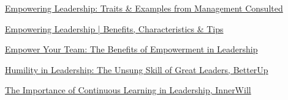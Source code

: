\documentclass[runningheads]{llncs}
\begin{document}
\begin{thebibliography}{10}
\href{https://managementconsulted.com/empowering-leadership/#:~:text=Here%20are%20some%20empowering%20leadership,They%20are%20effective%20communicators}{Empowering Leadership: Traits \& Examples from Management Consulted}

\href{https://www.leapsome.com/blog/empowering-leadership#:~:text=Empowering%20leadership%20is%20the%20practice,fits%20into%20the%20big%20picture}{Empowering Leadership | Benefits, Characteristics \& Tips}

\href{https://maven.com/articles/empowerment-in-leadership#:~:text=1,2}{Empower Your Team: The Benefits of Empowerment in Leadership}

\href{https://www.betterup.com/blog/humility-in-leadership}{Humility in Leadership: The Unsung Skill of Great Leaders, BetterUp}

\href{https://innerwill.org/continuous-learning-in-leadership/#:~:text=Our%20clients%20compete%20in%20various,very%20much%20their%20competitive%20advantage}{The Importance of Continuous Learning in Leadership, InnerWill}




\end{thebibliography}
\end{document}
